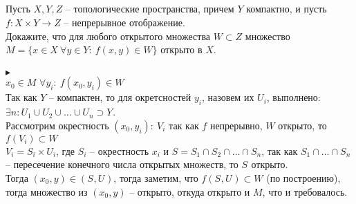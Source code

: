 		\subsection{}
		Пусть $X, Y, Z$ -- топологические пространства, причем $Y$ компактно, и пусть $f: X \times Y \to Z$ -- непрерывное отображение.\\
		Докажите, что для любого открытого множества $W \subset Z$ множество $M = \{x \in X\ \forall y \in Y:\ f(x,y) \in W\}$ открыто в $X$.\\
		\\
		$\blacktriangleright$\\
		$x_0 \in M$ $\forall y_i:\ f(x_0, y_i) \in W$\\
		Так как $Y$ -- компактен, то для окретсностей $y_i$, назовем их $U_i$, выполнено: $\exists n: U_1 \cup U_2 \cup \ldots \cup U_n \supset Y_{}$.\\
		Рассмотрим окрестность $(x_0, y_i):\ V_i$ так как $f$ непрерывно, $W$ открыто, то $f(V_i) \subset W$\\
		$V_i = S_i \times U_i$, где $S_i$ -- окрестность $x_i$ и $S = S_1 \cap S_2 \cap \ldots \cap S_n$, так как $S_1 \cap \ldots \cap S_n$ -- пересечение конечного числа открытых множеств, то $S_{}$ открыто.\\
		Тогда $(x_0, y) \in (S_{}, U_{})$, тогда заметим, что $f(S_{}, U_{}) \subset W$ (по построению), тогда множество из $(x_0, y)$ -- открыто, откуда открыто и $M$, что и требовалось.
